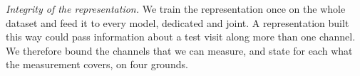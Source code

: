 %
\emph{Integrity of the representation.} We train the representation once on the whole dataset and feed it to every model, dedicated and joint. A representation built this way could pass information about a test visit along more than one channel. We therefore bound the channels that we can measure, and state for each what the measurement covers, on four grounds.

